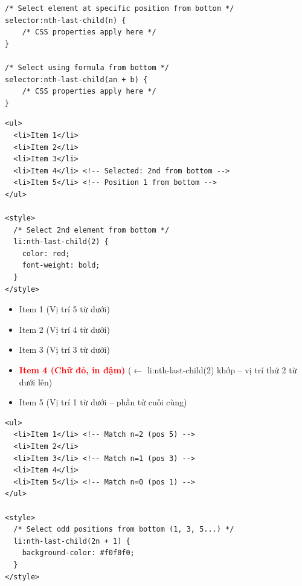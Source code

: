 \begin{codeWindow}
\begin{lstlisting}[language=CSS3]
/* Select element at specific position from bottom */
selector:nth-last-child(n) {
    /* CSS properties apply here */
}

/* Select using formula from bottom */
selector:nth-last-child(an + b) {
    /* CSS properties apply here */
}
\end{lstlisting}
\end{codeWindow}

\begin{codeWindow}
\begin{lstlisting}[language=HTML5]
<ul>
  <li>Item 1</li>
  <li>Item 2</li>
  <li>Item 3</li>
  <li>Item 4</li> <!-- Selected: 2nd from bottom -->
  <li>Item 5</li> <!-- Position 1 from bottom -->
</ul>

<style>
  /* Select 2nd element from bottom */
  li:nth-last-child(2) {
    color: red;
    font-weight: bold;
  }
</style>
\end{lstlisting}
\end{codeWindow}

\begin{browserWindow}
\sffamily\small
\begin{itemize}[leftmargin=1.5em, itemsep=2pt, parsep=0pt]
    \item Item 1 {\scriptsize\textcolor{gray!60}{(Vị trí 5 từ dưới)}}
    \item Item 2 {\scriptsize\textcolor{gray!60}{(Vị trí 4 từ dưới)}}
    \item Item 3 {\scriptsize\textcolor{gray!60}{(Vị trí 3 từ dưới)}}
    \item \textcolor{red}{\textbf{Item 4 (Chữ đỏ, in đậm)}} {\scriptsize\textcolor{gray!60}{($\leftarrow$ li:nth-last-child(2) khớp -- vị trí thứ 2 từ dưới lên)}}
    \item Item 5 {\scriptsize\textcolor{gray!60}{(Vị trí 1 từ dưới -- phần tử cuối cùng)}}
\end{itemize}
\end{browserWindow}

\begin{codeWindow}
\begin{lstlisting}[language=HTML5]
<ul>
  <li>Item 1</li> <!-- Match n=2 (pos 5) -->
  <li>Item 2</li>
  <li>Item 3</li> <!-- Match n=1 (pos 3) -->
  <li>Item 4</li>
  <li>Item 5</li> <!-- Match n=0 (pos 1) -->
</ul>

<style>
  /* Select odd positions from bottom (1, 3, 5...) */
  li:nth-last-child(2n + 1) {
    background-color: #f0f0f0;
  }
</style>
\end{lstlisting}
\end{codeWindow}

